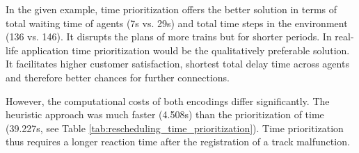 \documentclass[runningheads]{llncs}
\begin{document}
In the given example, time prioritization offers the better solution in terms of total waiting time of agents (7s vs. 29s) and total time steps in the environment (136 vs. 146). It disrupts the plans of more trains but for shorter periods. In real-life application time prioritization would be the qualitatively preferable solution. It facilitates higher customer satisfaction, shortest total delay time across agents and therefore better chances for further connections.

However, the computational costs of both encodings differ significantly. The heuristic approach was much faster (4.508s) than the prioritization of time (39.227s, see Table \ref{tab:rescheduling_time_prioritization}). Time prioritization thus requires a longer reaction time after the registration of a track malfunction.
\end{document}
